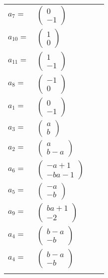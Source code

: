 \documentclass[1p]{elsarticle_modified}
\theoremstyle{definition}
\begin{document}
\begin{tabular}{m{7pt} m{180pt} m{7pt} m{180pt} }
\flushright $a_{7}=$&$\begin{pmatrix}0\\-1\end{pmatrix}$ \\
\flushright $a_{10}=$&$\begin{pmatrix}1\\0\end{pmatrix}$ \\
\flushright $a_{11}=$&$\begin{pmatrix}1\\-1\end{pmatrix}$ \\
\flushright $a_{8}=$&$\begin{pmatrix}-1\\0\end{pmatrix}$ \\
\flushright $a_{1}=$&$\begin{pmatrix}0\\-1\end{pmatrix}$ \\
\flushright $a_{3}=$&$\begin{pmatrix}a\\b\end{pmatrix}$ \\
\flushright $a_{2}=$&$\begin{pmatrix}a\\b- a\end{pmatrix}$ \\
\flushright $a_{6}=$&$\begin{pmatrix}- a+1\\- b a-1\end{pmatrix}$ \\
\flushright $a_{5}=$&$\begin{pmatrix}- a\\- b\end{pmatrix}$ \\
\flushright $a_{9}=$&$\begin{pmatrix}b a+1\\-2\end{pmatrix}$ \\
\flushright $a_{4}=$&$\begin{pmatrix}b- a\\- b\end{pmatrix}$\\ \flushright $a_{4}=$&$\begin{pmatrix}b- a\\- b\end{pmatrix}$\\&\end{tabular}
\end{document}
